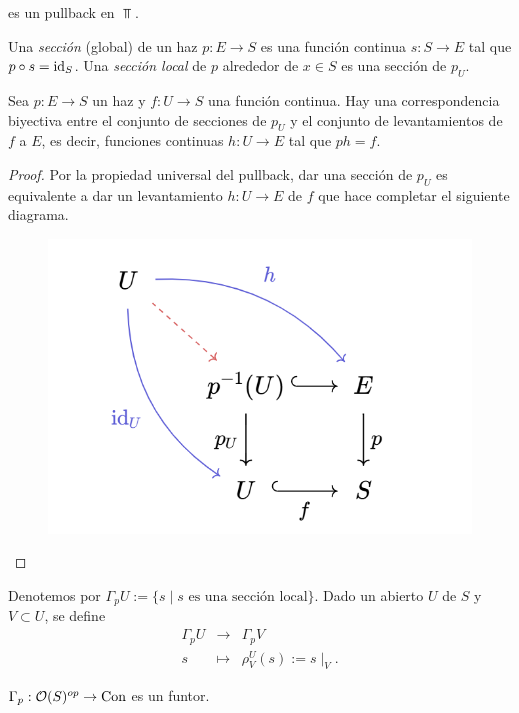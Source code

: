 \noindent
es un pullback en $\Top$. 
\begin{definition}[Sección] Una \emph{sección} (global) de un haz $p:E\to S$ es una función continua $s:S\to E$ tal que $p\circ s={\mathrm{id}}_S$. Una \emph{sección local} de $p$ alrededor de $x\in S$ es una sección de $p_U$. 
\end{definition}
\begin{prop}
    Sea $p:E\to S$ un haz y $f:U\to S$ una función continua. Hay una correspondencia biyectiva entre el conjunto de secciones de $p_U$ y el conjunto de levantamientos de $f$ a $E$, es decir, funciones continuas $h:U\to E$ tal que $ph=f$.
\end{prop}
\begin{proof}
    Por la propiedad universal del pullback, dar una sección de $p_U$ es equivalente a dar un levantamiento $h:U\to E$ de $f$ que hace completar el siguiente diagrama.
        \begin{figure}[H]
        \centering
        \includegraphics[width=0.43\linewidth]{img/diagram.2.2.3.png}
    \end{figure}
\end{proof}
\noindent
Denotemos por $\Gamma_pU:=\{s\mid s\text{ es una sección local}\}$. Dado un abierto $U$ de $S$ y $V\subset U$, se define
\begin{eqnarray*}
    \Gamma_pU&\to&\Gamma_p V\\
    s&\mapsto& \rho^U_V(s):=s\mid_V.
\end{eqnarray*}
\begin{lema}
    $\Gamma_p:{\mathcal O}(S)^{op}\to{\mathrm{Con}}$ es un funtor.
\end{lema}

